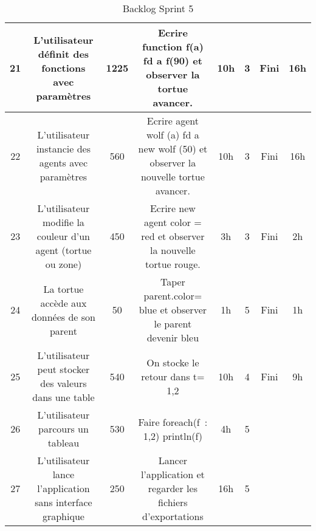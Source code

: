 \begin{table}
\begin{tabular}{|*{8}{c|}}
\hline
21 & L'utilisateur définit des fonctions avec paramètres & 1225 & Ecrire function f(a) { fd a } f(90) et observer la tortue avancer. & 10h & 3 & Fini & 16h \\
\hline
22 & L'utilisateur instancie des agents avec paramètres & 560 & Ecrire agent wolf (a) { fd a } new wolf (50) et observer la nouvelle tortue avancer. & 10h & 3 & Fini & 16h \\
\hline
23 & L'utilisateur modifie la couleur d'un agent (tortue ou zone) & 450 & Ecrire new agent { color = red } et observer la nouvelle tortue rouge. & 3h & 3 & Fini & 2h \\
\hline
24 & La tortue accède aux données de son parent & 50 & Taper parent.color= blue et observer le parent devenir bleu & 1h & 5 & Fini & 1h \\
\hline
25 & L'utilisateur peut stocker des valeurs dans une table & 540 & On stocke le retour dans t= {1,2} & 10h & 4 & Fini & 9h \\
\hline
26 & L'utilisateur parcours un tableau & 530 & Faire foreach(f~: {1,2}) println(f) & 4h & 5 &  &  \\
\hline
27 & L'utilisateur lance l'application sans interface graphique & 250 & Lancer l'application et regarder les fichiers d'exportations & 16h & 5 & &  \\
\hline
\end{tabular}
\caption{Backlog Sprint 5}
\label{bsp5} 
\end{table}
